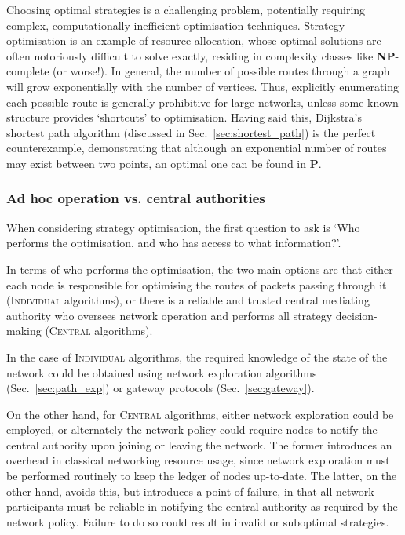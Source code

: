 Choosing optimal strategies is a challenging problem, potentially requiring complex, computationally inefficient optimisation techniques. Strategy optimisation is an example of resource allocation, whose optimal solutions are often notoriously difficult to solve exactly, residing in complexity classes like \textbf{NP}-complete (or worse!). In general, the number of possible routes through a graph will grow exponentially with the number of vertices. Thus, explicitly enumerating each possible route is generally prohibitive for large networks, unless some known structure provides `shortcuts' to optimisation. Having said this, Dijkstra's shortest path algorithm (discussed in Sec.~\ref{sec:shortest_path}) is the perfect counterexample, demonstrating that although an exponential number of routes may exist between two points, an optimal one can be found in \textbf{P}.

%
%

\subsubsection{Ad hoc operation vs. central authorities}  

When considering strategy optimisation, the first question to ask is `Who performs the optimisation, and who has access to what information?'.

In terms of who performs the optimisation, the two main options are that either each node is responsible for optimising the routes of packets passing through it (\textsc{Individual} algorithms), or there is a reliable and trusted central mediating authority who oversees network operation and performs all strategy decision-making (\textsc{Central} algorithms).

In the case of \textsc{Individual} algorithms, the required knowledge of the state of the network could be obtained using network exploration algorithms (Sec.~\ref{sec:path_exp}) or gateway protocols (Sec.~\ref{sec:gateway}). 

On the other hand, for \textsc{Central} algorithms, either network exploration could be employed, or alternately the network policy could require nodes to notify the central authority upon joining or leaving the network. The former introduces an overhead in classical networking resource usage, since network exploration must be performed routinely to keep the ledger of nodes up-to-date. The latter, on the other hand, avoids this, but introduces a point of failure, in that all network participants must be reliable in notifying the central authority as required by the network policy. Failure to do so could result in invalid or suboptimal strategies.

